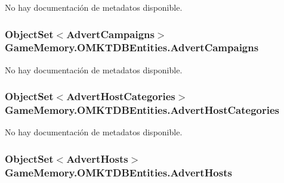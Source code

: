 No hay documentación de metadatos disponible. 

\hypertarget{class_game_memory_1_1_o_m_k_t_d_b_entities_ab75a946df8e841e032003de37ac359dd}{
\subsubsection[{Advert\-Campaigns}]{\setlength{\rightskip}{0pt plus 5cm}Object\-Set$<${\bf Advert\-Campaigns}$>$ Game\-Memory.\-O\-M\-K\-T\-D\-B\-Entities.\-Advert\-Campaigns\hspace{0.3cm}{\ttfamily [get]}}}\label{class_game_memory_1_1_o_m_k_t_d_b_entities_ab75a946df8e841e032003de37ac359dd}


No hay documentación de metadatos disponible. 

\hypertarget{class_game_memory_1_1_o_m_k_t_d_b_entities_a91d353c35878832820892fb655266900}{
\subsubsection[{Advert\-Host\-Categories}]{\setlength{\rightskip}{0pt plus 5cm}Object\-Set$<${\bf Advert\-Host\-Categories}$>$ Game\-Memory.\-O\-M\-K\-T\-D\-B\-Entities.\-Advert\-Host\-Categories\hspace{0.3cm}{\ttfamily [get]}}}\label{class_game_memory_1_1_o_m_k_t_d_b_entities_a91d353c35878832820892fb655266900}


No hay documentación de metadatos disponible. 

\hypertarget{class_game_memory_1_1_o_m_k_t_d_b_entities_ae27958ef39c96e4ef422a60a1bd07572}{
\subsubsection[{Advert\-Hosts}]{\setlength{\rightskip}{0pt plus 5cm}Object\-Set$<${\bf Advert\-Hosts}$>$ Game\-Memory.\-O\-M\-K\-T\-D\-B\-Entities.\-Advert\-Hosts\hspace{0.3cm}{\ttfamily [get]}}}\label{class_game_memory_1_1_o_m_k_t_d_b_entities_ae27958ef39c96e4ef422a60a1bd07572}


